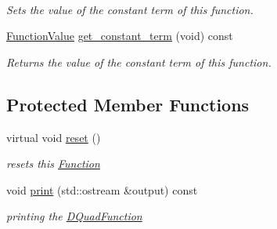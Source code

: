 \begin{Indent}
\begin{DoxyCompactItemize}
$$\begin{DoxyCompactList}\small\item\em Sets the value of the constant term of this function. \end{DoxyCompactList}\item 
\mbox{\label{class_s_m_spp__di__unipi__it_1_1_d_quad_function_aa7794d8e3c9b6967a6ae924a07131d0b}} 
\mbox{\hyperlink{class_s_m_spp__di__unipi__it_1_1_function_a9ad432406b609e28d340f73e9474bffe}{Function\+Value}} \mbox{\hyperlink{class_s_m_spp__di__unipi__it_1_1_d_quad_function_aa7794d8e3c9b6967a6ae924a07131d0b}{get\+\_\+constant\+\_\+term}} (void) const
\begin{DoxyCompactList}\small\item\em Returns the value of the constant term of this function. \end{DoxyCompactList}\end{DoxyCompactItemize}
\end{Indent}
\subsection*{Protected Member Functions}
\begin{DoxyCompactItemize}
\item 
virtual void \mbox{\hyperlink{class_s_m_spp__di__unipi__it_1_1_d_quad_function_a7b0e029102ad38f4b814c6523aedb53d}{reset}} ()
\begin{DoxyCompactList}\small\item\em resets this \mbox{\hyperlink{class_s_m_spp__di__unipi__it_1_1_function}{Function}} \end{DoxyCompactList}\item 
\mbox{\label{class_s_m_spp__di__unipi__it_1_1_d_quad_function_a4e1f59c2589efba7c429a92661a1f288}} 
void \mbox{\hyperlink{class_s_m_spp__di__unipi__it_1_1_d_quad_function_a4e1f59c2589efba7c429a92661a1f288}{print}} (std\+::ostream \&output) const
\begin{DoxyCompactList}\small\item\em printing the \mbox{\hyperlink{class_s_m_spp__di__unipi__it_1_1_d_quad_function}{D\+Quad\+Function}} \end{DoxyCompactList}\end{DoxyCompactItemize}
